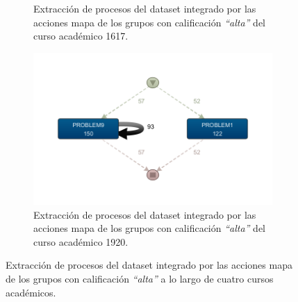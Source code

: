 \begin{figure}[H]
\begin{subfigure}[t]{0.60\textwidth}
    \caption{Extracción de procesos del dataset integrado por las acciones mapa de los grupos con calificación \emph{``alta''} del curso académico 1617.}
    \label{fig:mapYear1617HighGrades}
  \end{subfigure}
  \hfill
  \begin{subfigure}[t]{0.60\textwidth}
    \includegraphics[width=1.10\textwidth, height=0.80\textwidth]{imagenes/DISCO_map/Dataset FusionadoYear1920HighGrades.png}
    \caption{Extracción de procesos del dataset integrado por las acciones mapa de los grupos con calificación \emph{``alta''} del curso académico 1920.}
    \label{fig:mapYear1920HighGrades}
  \end{subfigure}
  \caption{Extracción de procesos del dataset integrado por las acciones mapa de los grupos con calificación \emph{``alta''} a lo largo de cuatro cursos académicos.}
\end{figure}

